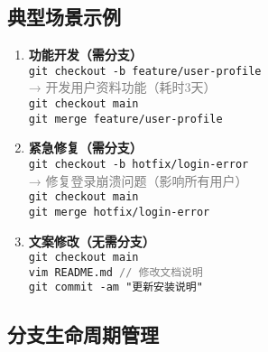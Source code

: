 \subsection{典型场景示例}
\begin{enumerate}[leftmargin=*, nosep]
    \item \textbf{功能开发（需分支）} \\
    \texttt{git checkout -b feature/user-profile} \\
    \textcolor{gray}{→ 开发用户资料功能（耗时3天）} \\
    \texttt{git checkout main} \\
    \texttt{git merge feature/user-profile}
    
    \item \textbf{紧急修复（需分支）} \\
    \texttt{git checkout -b hotfix/login-error} \\
    \textcolor{gray}{→ 修复登录崩溃问题（影响所有用户）} \\
    \texttt{git checkout main} \\
    \texttt{git merge hotfix/login-error}
    
    \item \textbf{文案修改（无需分支）} \\
    \texttt{git checkout main} \\
    \texttt{vim README.md \quad \textcolor{gray}{// 修改文档说明}} \\
    \texttt{git commit -am "更新安装说明"}
\end{enumerate}

\subsection{分支生命周期管理}
\begin{center}
\end{center}

